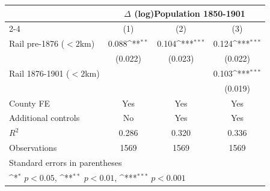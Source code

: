 {
\def\sym#1{\ifmmode^{#1}\else\(^{#1}\)\fi}
\begin{tabular}{l*{3}{c}}
\toprule
                &\multicolumn{3}{c}{$\Delta$ (log)Population 1850-1901}  \\\cmidrule(lr){2-4}
                &\multicolumn{1}{c}{(1)}         &\multicolumn{1}{c}{(2)}         &\multicolumn{1}{c}{(3)}         \\
\midrule
Rail pre-1876 ($<2$km)&    0.088\sym{**} &    0.104\sym{***}&    0.124\sym{***}\\
                &  (0.022)         &  (0.023)         &  (0.022)         \\
Rail 1876-1901 ($<2$km)&                  &                  &    0.103\sym{***}\\
                &                  &                  &  (0.019)         \\
County FE       &      Yes         &      Yes         &      Yes         \\
Additional controls &       No         &      Yes         &      Yes         \\
\midrule
\(R^{2}\)       &    0.286         &    0.320         &    0.336         \\
Observations    &     1569         &     1569         &     1569         \\
\bottomrule
\multicolumn{4}{l}{\footnotesize Standard errors in parentheses}\\
\multicolumn{4}{l}{\footnotesize \sym{*} \(p<0.05\), \sym{**} \(p<0.01\), \sym{***} \(p<0.001\)}\\
\end{tabular}
}
